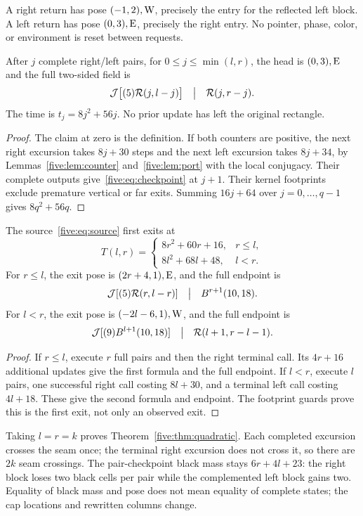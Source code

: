 A right return has pose $(-1,2),\mathrm W$, precisely the entry for the reflected
left block. A left return has pose $(0,3),\mathrm E$, precisely the right entry.
No pointer, phase, color, or environment is reset between requests.

\begin{lemma}\label{five:lem:round}
After $j$ complete right/left pairs, for $0\le j\le\min(l,r)$, the head is
$(0,3),\mathrm E$ and the full two-sided field is
\begin{equation}\label{five:eq:checkpoint}
 \mathcal J\bigl[(5)\mathcal R(j,l-j)\bigr]\quad\big|\quad\mathcal R(j,r-j).
\end{equation}
The time is $t_j=8j^2+56j$. No prior update has left the original rectangle.
\end{lemma}
\begin{proof}
The claim at zero is the definition. If both counters are positive, the next
right excursion takes $8j+30$ steps and the next left excursion takes $8j+34$,
by Lemmas~\ref{five:lem:counter} and~\ref{five:lem:port} with the local conjugacy.
Their complete outputs give~\eqref{five:eq:checkpoint} at $j+1$. Their kernel
footprints exclude premature vertical or far exits. Summing $16j+64$ over
$j=0,\ldots,q-1$ gives $8q^2+56q$.
\end{proof}

\begin{theorem}\label{five:thm:asym}
The source~\eqref{five:eq:source} first exits at
\[
T(l,r)=
\begin{cases}
8r^2+60r+16,&r\le l,\\
8l^2+68l+48,&l<r.
\end{cases}
\]
For $r\le l$, the exit pose is $(2r+4,1),\mathrm E$, and the full endpoint is
\[
 \mathcal J[(5)\mathcal R(r,l-r)]\quad\big|\quad B^{r+1}(10,18).
\]
For $l<r$, the exit pose is $(-2l-6,1),\mathrm W$, and the full endpoint is
\[
 \mathcal J[(9)B^{l+1}(10,18)]\quad\big|\quad\mathcal R(l+1,r-l-1).
\]
\end{theorem}
\begin{proof}
If $r\le l$, execute $r$ full pairs and then the right terminal call. Its
$4r+16$ additional updates give the first formula and the full endpoint.
If $l<r$, execute $l$ pairs, one successful right call costing $8l+30$, and a
terminal left call costing $4l+18$. These give the second formula and endpoint.
The footprint guards prove this is the first exit, not only an observed exit.
\end{proof}

Taking $l=r=k$ proves Theorem~\ref{five:thm:quadratic}. Each completed excursion
crosses the seam once; the terminal right excursion does not cross it, so
there are $2k$ seam crossings. The pair-checkpoint black mass stays
$6r+4l+23$: the right block loses two black cells per pair while the complemented
left block gains two. Equality of black mass and pose does not mean equality
of complete states; the cap locations and rewritten columns change.

